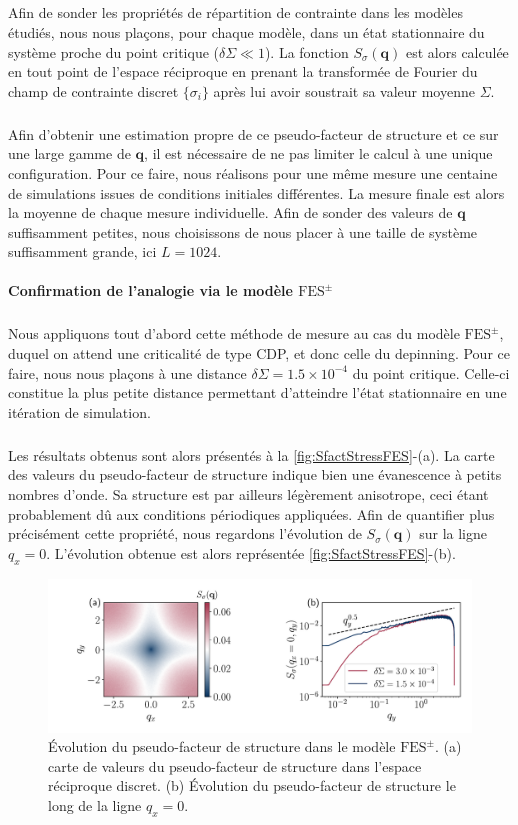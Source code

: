 \subparagraph{}Afin de sonder les propriétés de répartition de contrainte dans les modèles étudiés, nous nous plaçons, pour chaque modèle, dans un état stationnaire du système proche du point critique ($\delta\Sigma \ll 1$). La fonction $S_\sigma(\mathbf{q})$ est alors calculée en tout point de l'espace réciproque en prenant la transformée de Fourier du champ de contrainte discret $\{\sigma_i\}$ après lui avoir soustrait sa valeur moyenne $\Sigma$. 

\subparagraph{}Afin d'obtenir une estimation propre de ce pseudo-facteur de structure et ce sur une large gamme de $\mathbf{q}$, il est nécessaire de ne pas limiter le calcul à une unique configuration. Pour ce faire, nous réalisons pour une même mesure une centaine de simulations issues de conditions initiales différentes. La mesure finale est alors la moyenne de chaque mesure individuelle. Afin de sonder des valeurs de $\mathbf{q}$ suffisamment petites, nous choisissons de nous placer à une taille de système suffisamment grande, ici $L=1024$.

\paragraph{Confirmation de l'analogie via le modèle $\text{FES}^\pm$}

\subparagraph{}Nous appliquons tout d'abord cette méthode de mesure au cas du modèle $\text{FES}^\pm$, duquel on attend une criticalité de type CDP, et donc celle du depinning. Pour ce faire, nous nous plaçons à une distance $\delta\Sigma = 1.5\times 10^{-4}$ du point critique. Celle-ci constitue la plus petite distance permettant d'atteindre l'état stationnaire en une itération de simulation.

\subparagraph{}Les résultats obtenus sont alors présentés à la \autoref{fig:SfactStressFES}-(a). La carte des valeurs du pseudo-facteur de structure indique bien une évanescence à petits nombres d'onde. Sa structure est par ailleurs légèrement anisotrope, ceci étant probablement dû aux conditions périodiques appliquées. Afin de quantifier plus précisément cette propriété, nous regardons l'évolution de $S_\sigma(\mathbf{q})$ sur la ligne $q_x = 0$. L'évolution obtenue est alors représentée \autoref{fig:SfactStressFES}-(b).

\begin{figure}[h]
	\centering	\includegraphics[width=\textwidth]{Chapitre4/Figures/Correlations/Sfact_SRPNC.pdf}
	\caption{Évolution du pseudo-facteur de structure dans le modèle $\text{FES}^\pm$. (a) carte de valeurs du pseudo-facteur de structure dans l'espace réciproque discret. (b) Évolution du pseudo-facteur de structure le long de la ligne $q_x=0$.}
	\label{fig:SfactStressFES}
\end{figure}

